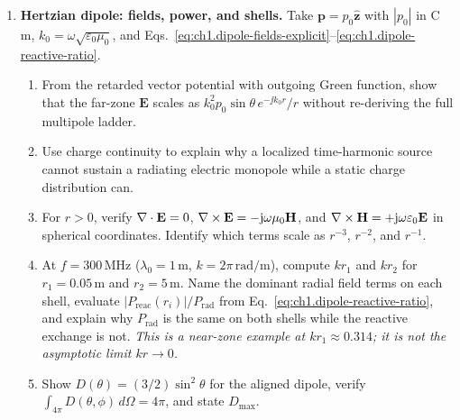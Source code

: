 \begin{enumerate}
\item \textbf{Hertzian dipole: fields, power, and shells.}
Take $\mathbf{p}=p_0\hat{\mathbf{z}}$ with $|p_0|$ in C\,m, $k_0=\omega\sqrt{\varepsilon_0\mu_0}$, and Eqs.~\eqref{eq:ch1.dipole-fields-explicit}--\eqref{eq:ch1.dipole-reactive-ratio}.
\begin{enumerate}[label=(\alph*)]
\item From the retarded vector potential with outgoing Green function, show that the far-zone $\mathbf{E}$ scales as $k_0^2 p_0\sin\theta\,e^{-\jj k_0 r}/r$ without re-deriving the full multipole ladder.
\item Use charge continuity to explain why a localized time-harmonic source cannot sustain a radiating electric monopole while a static charge distribution can.
\item For $r>0$, verify $\nabla\cdot\mathbf{E}=0$, $\nabla\times\mathbf{E}=-\mathrm{j}\omega\mu_0\mathbf{H}$, and $\nabla\times\mathbf{H}=+\mathrm{j}\omega\varepsilon_0\mathbf{E}$ in spherical coordinates. Identify which terms scale as $r^{-3}$, $r^{-2}$, and $r^{-1}$.
\item At $f=300\,\mathrm{MHz}$ ($\lambda_0=1\,\mathrm{m}$, $k=2\pi\,\mathrm{rad/m}$), compute $kr_1$ and $kr_2$ for $r_1=0.05\,\mathrm{m}$ and $r_2=5\,\mathrm{m}$. Name the dominant radial field terms on each shell, evaluate $|P_{\mathrm{reac}}(r_i)|/P_{\mathrm{rad}}$ from Eq.~\eqref{eq:ch1.dipole-reactive-ratio}, and explain why $P_{\mathrm{rad}}$ is the same on both shells while the reactive exchange is not. \emph{This is a near-zone example at $kr_1\approx0.314$; it is not the asymptotic limit $kr\to0$.}
\item Show $D(\theta)=(3/2)\sin^2\theta$ for the aligned dipole, verify $\int_{4\pi}D(\theta,\phi)\,d\Omega=4\pi$, and state $D_{\max}$.
\end{enumerate}


\end{enumerate}
